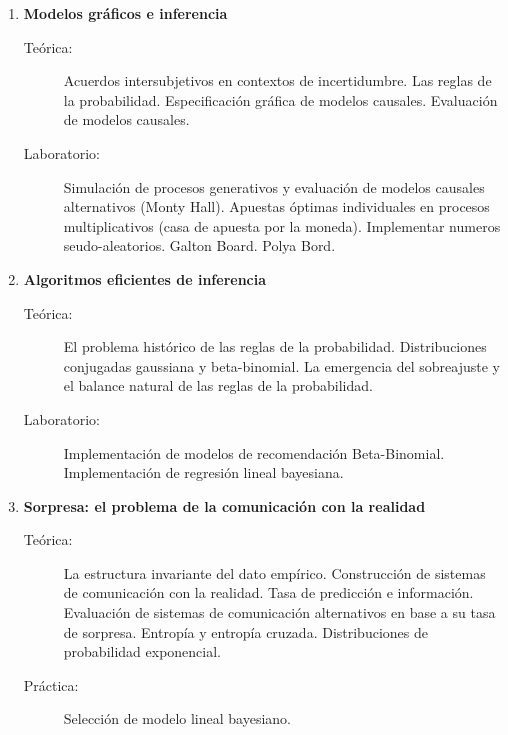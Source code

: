 \documentclass[10pt]{article}
\begin{document}
\begin{enumerate}

\item \textbf{Modelos gráficos e inferencia}
\vspace{-0.15cm}
\begin{description}
\item[Teórica:] Acuerdos intersubjetivos en contextos de incertidumbre. Las reglas de la probabilidad. Especificación gráfica de modelos causales. Evaluación de modelos causales.
\item[Laboratorio:] Simulación de procesos generativos y evaluación de modelos causales alternativos (Monty Hall). Apuestas óptimas individuales en procesos multiplicativos (casa de apuesta por la moneda). Implementar numeros seudo-aleatorios. Galton Board. Polya Bord.
\end{description}


\item \textbf{Algoritmos eficientes de inferencia}
\vspace{-0.15cm}
\begin{description}
\item[Teórica:] El problema histórico de las reglas de la probabilidad. Distribuciones conjugadas gaussiana y beta-binomial. La emergencia del sobreajuste y el balance natural de las reglas de la probabilidad.
\item[Laboratorio:] Implementación de modelos de recomendación Beta-Binomial. Implementación de regresión lineal bayesiana.
\end{description}

\vspace{0.1cm}
\item \textbf{Sorpresa: el problema de la comunicación con la realidad}
\vspace{-0.15cm}
\begin{description}
\item[Teórica:] La estructura invariante del dato empírico. Construcción de sistemas de comunicación con la realidad. Tasa de predicción e información. Evaluación de sistemas de comunicación alternativos en base a su tasa de sorpresa. Entropía y entropía cruzada. Distribuciones de probabilidad exponencial.
\item[Práctica:] Selección de modelo lineal bayesiano.
\end{description}



\end{enumerate}
\end{document}
